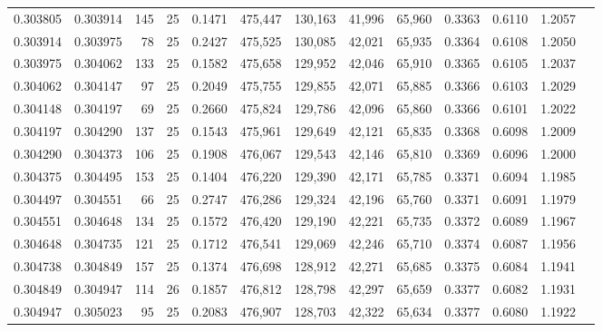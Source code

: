 \begin{tabular}{rrrrrrrrrrrrr}
0.303805 & 0.303914 &   145 &  25 &                                     0.1471 & 475,447 & 130,163 &  41,996 &  65,960 & 0.3363 & 0.6110 & 1.2057 \\
0.303914 & 0.303975 &    78 &  25 &                                     0.2427 & 475,525 & 130,085 &  42,021 &  65,935 & 0.3364 & 0.6108 & 1.2050 \\
0.303975 & 0.304062 &   133 &  25 &                                     0.1582 & 475,658 & 129,952 &  42,046 &  65,910 & 0.3365 & 0.6105 & 1.2037 \\
0.304062 & 0.304147 &    97 &  25 &                                     0.2049 & 475,755 & 129,855 &  42,071 &  65,885 & 0.3366 & 0.6103 & 1.2029 \\
0.304148 & 0.304197 &    69 &  25 &                                     0.2660 & 475,824 & 129,786 &  42,096 &  65,860 & 0.3366 & 0.6101 & 1.2022 \\
0.304197 & 0.304290 &   137 &  25 &                                     0.1543 & 475,961 & 129,649 &  42,121 &  65,835 & 0.3368 & 0.6098 & 1.2009 \\
0.304290 & 0.304373 &   106 &  25 &                                     0.1908 & 476,067 & 129,543 &  42,146 &  65,810 & 0.3369 & 0.6096 & 1.2000 \\
0.304375 & 0.304495 &   153 &  25 &                                     0.1404 & 476,220 & 129,390 &  42,171 &  65,785 & 0.3371 & 0.6094 & 1.1985 \\
0.304497 & 0.304551 &    66 &  25 &                                     0.2747 & 476,286 & 129,324 &  42,196 &  65,760 & 0.3371 & 0.6091 & 1.1979 \\
0.304551 & 0.304648 &   134 &  25 &                                     0.1572 & 476,420 & 129,190 &  42,221 &  65,735 & 0.3372 & 0.6089 & 1.1967 \\
0.304648 & 0.304735 &   121 &  25 &                                     0.1712 & 476,541 & 129,069 &  42,246 &  65,710 & 0.3374 & 0.6087 & 1.1956 \\
0.304738 & 0.304849 &   157 &  25 &                                     0.1374 & 476,698 & 128,912 &  42,271 &  65,685 & 0.3375 & 0.6084 & 1.1941 \\
0.304849 & 0.304947 &   114 &  26 &                                     0.1857 & 476,812 & 128,798 &  42,297 &  65,659 & 0.3377 & 0.6082 & 1.1931 \\
0.304947 & 0.305023 &    95 &  25 &                                     0.2083 & 476,907 & 128,703 &  42,322 &  65,634 & 0.3377 & 0.6080 & 1.1922 \\

\end{tabular}
